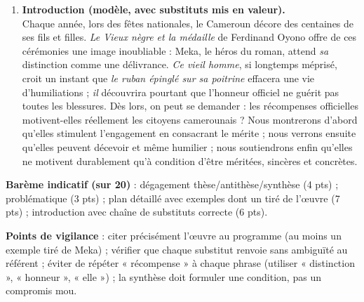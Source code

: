 \documentclass[11pt]{article}
\begin{document}
\begin{corrige}
\begin{enumerate}
\begin{itemize}
\item \textbf{II. Mais elles peuvent décevoir, voire humilier (antithèse).} Arg. 1 : une récompense tardive ou dérisoire ne répare pas les souffrances vécues (ex. : la médaille de Meka, épinglée après une vie de corvées, laisse en lui « une étrange tristesse »). Arg. 2 : distribuées sans justice, elles perdent toute valeur et découragent (ex. : les distinctions obtenues par favoritisme ou relations, qui découragent les vrais travailleurs).
\item \textbf{III. Les récompenses ne motivent que si elles sont méritées et sincères (synthèse).} Arg. 1 : la distinction doit couronner un mérite réel, vérifié par tous (ex. : un instituteur de village décoré devant sa communauté, dont tous connaissent le dévouement). Arg. 2 : elle doit s'accompagner d'une reconnaissance concrète (pension, promotion, moyens) (ex. : les primes et avantages accordés aux lauréats des grands concours nationaux).
\end{itemize}
\item \textbf{Introduction (modèle, avec substituts mis en valeur).} \\
Chaque année, lors des fêtes nationales, le Cameroun décore des centaines de ses fils et filles. \emph{Le Vieux nègre et la médaille} de Ferdinand Oyono offre de ces cérémonies une image inoubliable : Meka, le héros du roman, attend \emph{sa} distinction comme une délivrance. \emph{Ce vieil homme}, si longtemps méprisé, croit un instant que \emph{le ruban épinglé sur sa poitrine} effacera une vie d'humiliations ; \emph{il} découvrira pourtant que l'honneur officiel ne guérit pas toutes les blessures. Dès lors, on peut se demander : les récompenses officielles motivent-elles réellement les citoyens camerounais ? Nous montrerons d'abord qu'elles stimulent l'engagement en consacrant le mérite ; nous verrons ensuite qu'elles peuvent décevoir et même humilier ; nous soutiendrons enfin qu'elles ne motivent durablement qu'à condition d'être méritées, sincères et concrètes.
\end{enumerate}

\textbf{Barème indicatif (sur 20)} : dégagement thèse/antithèse/synthèse (4 pts) ; problématique (3 pts) ; plan détaillé avec exemples dont un tiré de l'œuvre (7 pts) ; introduction avec chaîne de substituts correcte (6 pts).

\textbf{Points de vigilance} : citer précisément l'œuvre au programme (au moins un exemple tiré de Meka) ; vérifier que chaque substitut renvoie sans ambiguïté au référent ; éviter de répéter « récompense » à chaque phrase (utiliser « distinction », « honneur », « elle ») ; la synthèse doit formuler une condition, pas un compromis mou.
\end{corrige}
\end{document}
